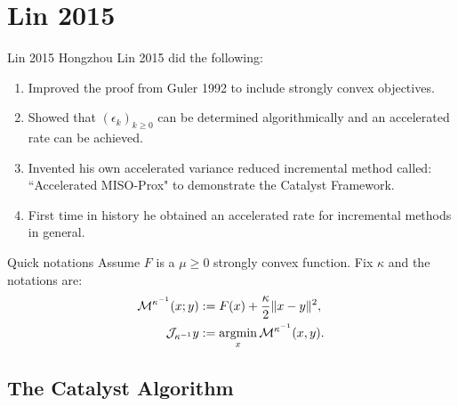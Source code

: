 \documentclass[11pt]{beamer}
\begin{document}
\section{Lin 2015}
    \begin{frame}{Lin 2015}
        Hongzhou Lin 2015 \cite{lin_universal_2015} did the following: 
        {\small
        \begin{enumerate}
            \item Improved the proof from Guler 1992 to include strongly convex objectives. 
            \item Showed that $(\epsilon_k)_{k\ge 0}$ can be determined algorithmically and  an accelerated rate can be achieved. 
            \item Invented his own accelerated variance reduced incremental method called: ``Accelerated MISO-Prox" to demonstrate the Catalyst Framework. 
            \item First time in history he obtained an accelerated rate for incremental methods in general. 
        \end{enumerate}
        }
        \begin{block}{Quick notations}
            Assume $F$ is a $\mu \ge 0$ strongly convex function. 
            Fix $\kappa$ and the notations are: 
            \begin{align*}
                \mathcal M^{\kappa^{-1}}(x; y) &:= F(x) + \frac{\kappa}{2}\Vert x - y\Vert^2, 
                \\
                \mathcal J_{\kappa^{-1}} y &:= \mathop{\rm argmin}\limits_x \mathcal M^{\kappa^{-1}} (x, y). 
            \end{align*}
        \end{block}
    \end{frame}
    \subsection{The Catalyst Algorithm}
\end{document}
